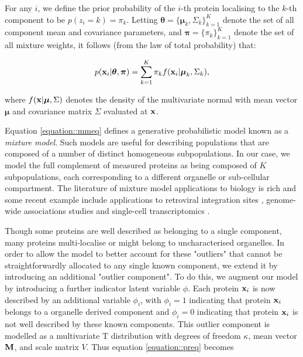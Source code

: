 \documentclass[12pt,english]{article}\usepackage[]{graphicx}\usepackage[]{color}
\begin{document}
For any $i$, we define the prior probability of the $i$-th protein
localising to the $k$-th component to be $p(z_i = k) = \pi_k$.
Letting
$\boldsymbol{\theta} = \{\boldsymbol{\mu}_k, \Sigma_k \}_{k = 1}^K$
denote the set of all component mean and covariance parameters, and
$\boldsymbol{\pi} = \{\pi_k\}_{k = 1}^K$ denote the set of all mixture
weights, it follows (from the law of total probability) that:

\begin{align}
p({\bf x}_i | \boldsymbol{\theta}, \boldsymbol{\pi} ) = \sum_{k = 1}^K \pi_k f({\bf x}_i|\boldsymbol{\mu}_k, \Sigma_k),\label{equation::mmeq}
\end{align}

where $f({\bf x} | \boldsymbol{\mu}, \Sigma)$ denotes the density of
the multivariate normal with mean vector $\boldsymbol{\mu}$ and
covariance matrix $\Sigma$ evaluated at ${\bf x}$.

Equation \eqref{equation::mmeq} defines a generative probabilistic
model known as a {\em mixture model}.  Such models are useful for
describing populations that are composed of a number of distinct
homogeneous subpopulations.  In our case, we model the full complement
of measured proteins as being composed of $K$ subpopulations, each
corresponding to a different organelle or sub-cellular
compartment. The literature of mixture model applications to biology
is rich and some recent example include applications to retroviral
integration sites \citep{Kirk:2016}, genome-wide associations studies
\citep{Liley:2017} and single-cell transcriptomics
\citep{Lonnberg:2017}.

Though some proteins are well described as belonging to a single
component, many proteins multi-localise or might belong to
uncharacterised organelles. In order to allow the model to better
account for these "outliers" that cannot be straightforwardly
allocated to any single known component, we extend it by introducing
an additional "outlier component". To do this, we augment our model by
introducing a further indicator latent variable $\phi$. Each protein
${\bf x}_i$ is now described by an additional variable $\phi_i$, with
$\phi_i = 1$ indicating that protein ${\bf x}_i$ belongs to a
organelle derived component and $\phi_i = 0$ indicating that protein
${\bf x}_i$ is not well described by these known components. This
outlier component is modelled as a multivariate T distribution with
degrees of freedom $\kappa$, mean vector $\bf{M}$, and scale matrix
$V$. Thus equation \eqref{equation::preq} becomes
\end{document}
